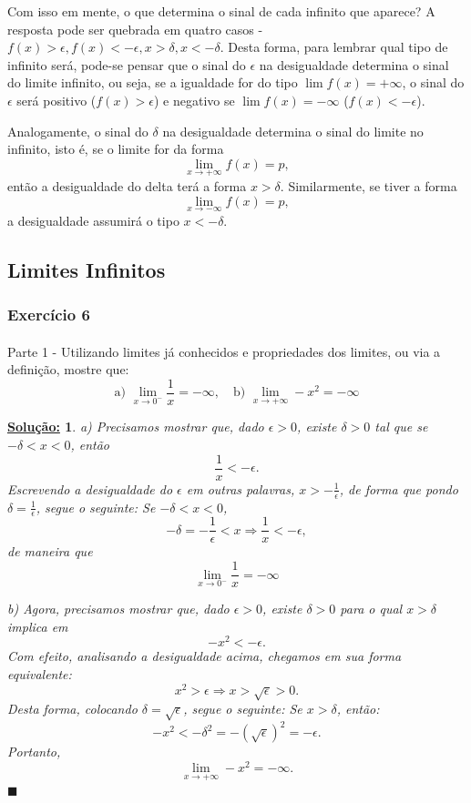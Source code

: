 \documentclass{article}
\newtheorem*{sol*}{\underline{Solu\c c\~ao:}}
\renewcommand\qedsymbol{$\blacksquare$}
\begin{document}
Com isso em mente, o que determina o sinal de cada infinito que aparece? A resposta pode ser quebrada em quatro casos - $f(x) > \epsilon, f(x) < -\epsilon, x > \delta, x < -\delta$. Desta forma, para lembrar qual tipo de infinito ser\'a, pode-se pensar que o sinal do $\epsilon$ na desigualdade determina o sinal do limite infinito, ou seja, se a igualdade for do tipo $\lim f(x) = +\infty$, o sinal do $\epsilon$ ser\'a positivo ($f(x) > \epsilon$) e negativo se $\lim f(x) = -\infty$ ($f(x) < -\epsilon$).

Analogamente, o sinal do $\delta$ na desigualdade determina o sinal do limite no infinito, isto \'e, se o limite for da forma
$$
	\lim_{x\to+\infty} f(x) = p,
$$
ent\~ao a desigualdade do delta ter\'a a forma $x > \delta$. Similarmente, se tiver a forma
$$
	\lim_{x\to-\infty} f(x) = p,
$$
a desigualdade assumir\'a o tipo $x < -\delta.$

\subsection{Limites Infinitos}
\subsubsection{Exerc\'icio 6}
\paragraph{}Parte 1 - Utilizando limites j\'a conhecidos e propriedades dos limites, ou via a defini\c c\~ao, mostre que:
$$
	\text{a) }\lim_{x\to{0^{-}}}{\frac{1}{x}} = -\infty, \quad \text{b) }\lim_{x\to+\infty} -x^2 = -\infty
$$
\begin{sol*}
	a) Precisamos mostrar que, dado $\epsilon > 0$, existe $\delta > 0$ tal que se $-\delta < x < 0$, ent\~ao
	$$
		\frac{1}{x} < -\epsilon.
	$$
	Escrevendo a desigualdade do $\epsilon$ em outras palavras, $x > -\frac{1}{\epsilon}$, de forma que pondo $\delta = \frac{1}{\epsilon}$, segue o seguinte: Se $-\delta < x < 0$,
	$$
		-\delta  = -\frac{1}{\epsilon} < x \Rightarrow \frac{1}{x} < -\epsilon,
	$$
	de maneira que
	$$
		\lim_{x\to{0^{-}}}{\frac{1}{x}} = -\infty
	$$

	b) Agora, precisamos mostrar que, dado $\epsilon > 0$, existe $\delta > 0$ para o qual $x > \delta$ implica em
	$$
		-x^2 < -\epsilon.
	$$
	Com efeito, analisando a desigualdade acima, chegamos em sua forma equivalente:
	$$
		x^2 > \epsilon\Rightarrow x > \sqrt{\epsilon} > 0.
	$$
	Desta forma, colocando $\delta = \sqrt{\epsilon}$, segue o seguinte: Se $x > \delta$, ent\~ao:
	$$
		-x^2 < -\delta^2 = -(\sqrt{\epsilon})^2 = -\epsilon.
	$$
	Portanto,
	$$
		\lim_{x\to+\infty} -x^2 = -\infty.
	$$
	\qedsymbol
\end{sol*}
\end{document}
